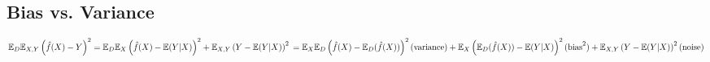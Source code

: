 
\subsection*{Bias vs. Variance}
\setlength{\mathindent}{0cm}
$
\mathbb{E}_D\mathbb{E}_{X,Y}\left(\hat{f}(X)-Y\right)^2 = \\
\mathbb{E}_D\mathbb{E}_X\left(\hat{f}(X) - \mathbb{E}(Y|X)\right)^2 + \mathbb{E}_{X,Y}\left(Y - \mathbb{E}(Y|X)\right)^2\\
= \mathbb{E}_X \mathbb{E}_D\left(\hat{f}(X) - \mathbb{E}_D(\hat{f}(X))\right)^2 \text{(variance)}\\
+ \mathbb{E}_X\left(\mathbb{E}_D(\hat{f}(X)) - \mathbb{E}(Y|X)\right)^2 \text{(bias}^2)\\
+ \mathbb{E}_{X,Y}\left(Y - \mathbb{E}(Y|X)\right)^2 \text{(noise)}
$\\


